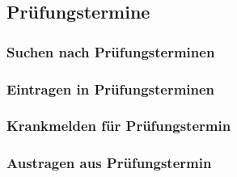 \subsection{Prüfungstermine}
\subsubsection{Suchen nach Prüfungsterminen}
\subsubsection{Eintragen in Prüfungsterminen}
\subsubsection{Krankmelden für Prüfungstermin}
\subsubsection{Austragen aus Prüfungstermin}